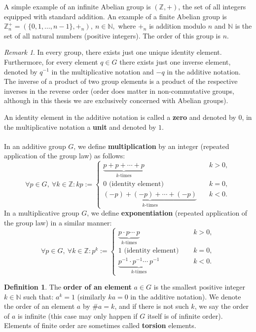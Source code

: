 \documentclass[thesis=M,english]{FITthesis}[2012/10/20]
\theoremstyle{remark}
\newtheorem*{RM}{Remark}
\theoremstyle{definition}
\newtheorem{DF}{Definition}[section]
\begin{document}
\noindent A simple example of an infinite Abelian group is $(\mathbb{Z}, +)$, the set of all integers equipped with standard addition. An example of a finite Abelian group is $\mathbb{Z}_n^+ = (\{0, 1, \ldots, n-1\}, +_{n}),\ n \in \mathbb{N},$ where $+_n$ is addition modulo $n$ and $\mathbb{N}$ is the set of all natural numbers (positive integers). The order of this group is $n$.
\begin{RM}
In every group, there exists just one unique identity element. Furthermore, for every element $q \in G$ there exists just one inverse element, denoted by $q^{-1}$ in the multiplicative notation and $-q$ in the additive notation. The inverse of a product of two group elements is a product of the respective inverses in the reverse order (order does matter in non-commutative groups, although in this thesis we are exclusively concerned with Abelian groups).
\end{RM}
\noindent An identity element in the additive notation is called a \textbf{zero} and denoted by $0$, in the multiplicative notation a \textbf{unit} and denoted by $1$. \\ \\
In an additive group $G$, we define \textbf{multiplication} by an integer (repeated application of the group law) as follows:
$$
\forall p \in G,\ \forall k \in \mathbb{Z}: kp := \begin{cases} \underbrace{p + p + \cdots + p}_{\text{$k$-times}} &\quad k > 0, \\
0 \text{ (identity element) } &\quad k = 0, \\
\underbrace{(-p) + (-p) + \cdots + (-p)}_{\text{$k$-times}} &\quad k < 0.
\end{cases}
$$
In a multiplicative group $G$, we define \textbf{exponentiation} (repeated application of the group law) in a similar manner:
$$
\forall p \in G,\ \forall k \in \mathbb{Z}: p^k := \begin{cases} \underbrace{p \cdot p \cdots\ p}_{\text{$k$-times}} &\quad k > 0, \\
1 \text{ (identity element) } &\quad k = 0, \\
\underbrace{p^{-1} \cdot p^{-1} \cdots\ p^{-1}}_{\text{$k$-times}} &\quad k < 0.
\end{cases}
$$
\begin{DF}
The \textbf{order of an element} $a \in G$ is the smallest positive integer $k \in \mathbb{N}$ such that: $a^k = 1$ (similarly $ka = 0$ in the additive notation). We denote the order of an element $a$ by $\#a= k$, and if there is not such $k$, we say the order of $a$ is infinite (this case may only happen if $G$ itself is of infinite order). Elements of finite order are sometimes called \textbf{torsion} elements.
\end{DF}
\end{document}
